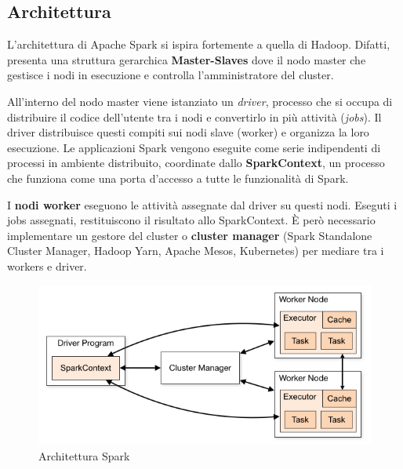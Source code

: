 \subsection{Architettura}
L'architettura di Apache Spark si ispira fortemente a quella di Hadoop. Difatti, presenta una struttura gerarchica \textbf{Master-Slaves} dove il nodo master che gestisce i nodi in esecuzione e controlla l’amministratore del cluster. 

All'interno del nodo master viene istanziato un \textit{driver}, processo che si occupa di distribuire il codice dell’utente tra i nodi e convertirlo in più attività (\textit{jobs}). Il driver distribuisce questi compiti sui nodi slave (worker) e organizza la loro esecuzione.  Le applicazioni Spark vengono eseguite come serie indipendenti di processi in ambiente distribuito, coordinate dallo \textbf{SparkContext}, un processo che funziona come una porta d'accesso a tutte le funzionalità di Spark.

I \textbf{nodi worker} eseguono le attività assegnate dal driver su questi nodi. Eseguti i jobs assegnati, restituiscono il risultato allo SparkContext. 
È però necessario implementare un gestore del cluster o \textbf{cluster manager} (Spark Standalone Cluster Manager, Hadoop Yarn, Apache Mesos, Kubernetes) per mediare tra i workers e driver. 
\begin{figure}[hbt!]
    \centering
    \includegraphics[width=1\textwidth]{img/sparkarchitecture.png}
    \caption{Architettura Spark}
    \label{fig:spark_architettura}
\end{figure}\\

